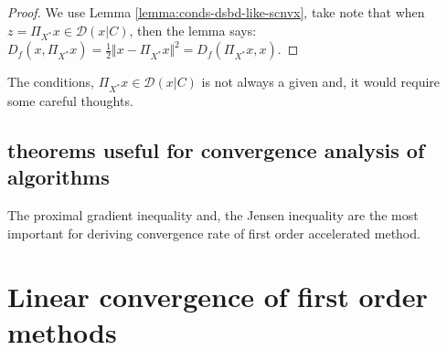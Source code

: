 \documentclass[12pt]{article}
\begin{document}
        \begin{proof}
            We use Lemma \ref{lemma:conds-dsbd-like-scnvx}, take note that when $z = \Pi_{X^*} x \in \mathcal D(x | C)$, then the lemma says: $D_f(x, \Pi_{X^*}x) = \frac{1}{2}\Vert x - \Pi_{X^*}x\Vert^2= D_f(\Pi_{X^*}x, x)$. 
        \end{proof}
        \begin{remark}
            The conditions, $\Pi_{X^*}x \in \mathcal D(x | C)$ is not always a given and, it would require some careful thoughts. 
        \end{remark}
    \subsection{theorems useful for convergence analysis of algorithms}
        The proximal gradient inequality and, the Jensen inequality are the most important for deriving convergence rate of first order accelerated method. 


\section{Linear convergence of first order methods}
    

    






\end{document}
